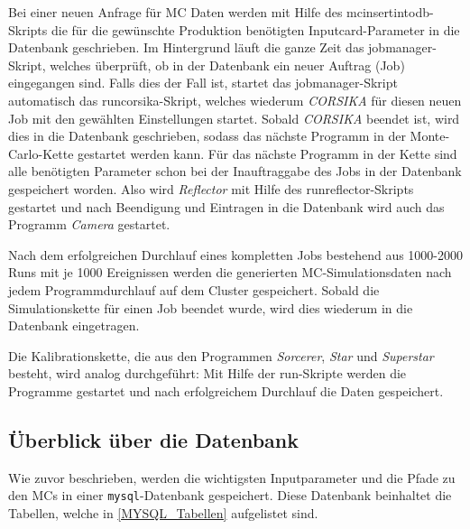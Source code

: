Bei einer neuen Anfrage für MC Daten werden mit Hilfe des mcinsertintodb-Skripts die für die gewünschte Produktion benötigten Inputcard-Parameter in die Datenbank geschrieben.
Im Hintergrund läuft die ganze Zeit das jobmanager-Skript, welches überprüft, ob in der Datenbank ein neuer Auftrag (Job) eingegangen sind.
Falls dies der Fall ist, startet das jobmanager-Skript automatisch das runcorsika-Skript, welches wiederum \textit{CORSIKA} für diesen neuen Job mit den gewählten Einstellungen startet.
Sobald \textit{CORSIKA} beendet ist, wird dies in die Datenbank geschrieben, sodass das nächste Programm in der Monte-Carlo-Kette gestartet werden kann.
Für das nächste Programm in der Kette sind alle benötigten Parameter schon bei der Inauftraggabe des Jobs in der Datenbank gespeichert worden.
Also wird \textit{Reflector} mit Hilfe des runreflector-Skripts gestartet und nach Beendigung und Eintragen in die Datenbank wird auch das Programm \textit{Camera} gestartet.

Nach dem erfolgreichen Durchlauf eines kompletten Jobs  bestehend aus 1000-2000 Runs mit je 1000 Ereignissen werden die generierten MC-Simulationsdaten nach jedem Programmdurchlauf auf dem Cluster gespeichert.
Sobald die Simulationskette für einen Job beendet wurde, wird dies wiederum in die Datenbank eingetragen.

Die Kalibrationskette, die aus den Programmen \textit{Sorcerer}, \textit{Star} und \textit{Superstar} besteht, wird analog durchgeführt:
Mit Hilfe der run-Skripte werden die Programme gestartet und nach erfolgreichem Durchlauf die Daten gespeichert.

\subsection{Überblick über die Datenbank}
Wie zuvor beschrieben, werden die wichtigsten Inputparameter und die Pfade zu den MCs in einer \texttt{mysql}-Datenbank gespeichert.
Diese Datenbank beinhaltet die Tabellen, welche in \autoref{MYSQL_Tabellen} aufgelistet sind.

